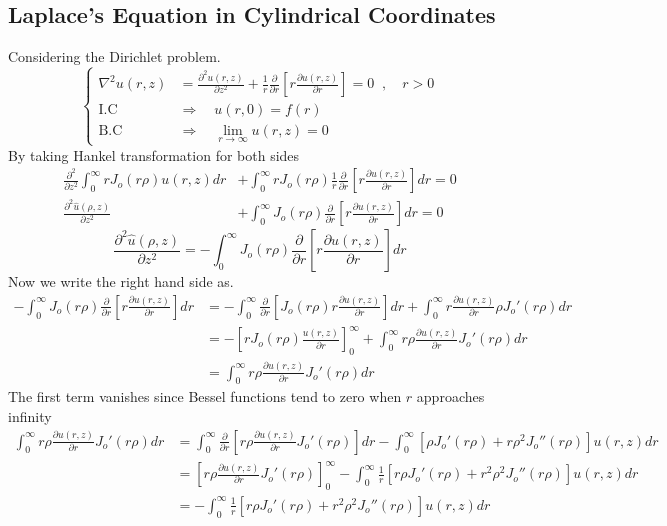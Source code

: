 \documentclass[]{article}
\begin{document}
\subsection{Laplace's Equation in Cylindrical Coordinates}
Considering the Dirichlet problem.
\[
    \begin{cases}
        \displaystyle \nabla^2 u(r,z) &= \frac{\partial^2 u(r,z)}{\partial z^2} + \frac{1}{r}\frac{\partial}{\partial r}\left[r\frac{\partial u(r,z)}{\partial r}\right] = 0 \;\; , \quad r >0
        \\
        \text{I.C} \quad &\Longrightarrow \quad u(r,0) = f(r)
        \\
        \text{B.C} \quad &\Longrightarrow \quad \lim_{r\rightarrow\infty} u(r,z) =0
    \end{cases}
\]
By taking Hankel transformation for both sides
\begin{align*}
\frac{\partial^2 }{\partial z^2}\int_{0}^{\infty} rJ_o(r\rho)u(r,z) dr &+ \int_{0}^{\infty}rJ_o(r\rho)\frac{1}{r}\frac{\partial}{\partial r}\left[r\frac{\partial u(r,z)}{\partial r}\right]dr = 0
\\
\frac{\partial^2 \hat{u}(\rho,z)}{\partial z^2} &+ \int_{0}^{\infty}J_o(r\rho)\frac{\partial}{\partial r}\left[r\frac{\partial u(r,z)}{\partial r}\right]dr = 0
\end{align*}
\[
    \frac{\partial^2 \hat{u}(\rho,z)}{\partial z^2}  = -\int_{0}^{\infty}J_o(r\rho)\frac{\partial}{\partial r}\left[r\frac{\partial u(r,z)}{\partial r}\right]dr    
\]
Now we write the right hand side as.
\begin{align*}
-\int_{0}^{\infty}J_o(r\rho)\frac{\partial}{\partial r}\left[r\frac{\partial u(r,z)}{\partial r}\right]dr &= -\int_{0}^{\infty}\frac{\partial}{\partial r}\left[J_o(r\rho)r\frac{\partial u(r,z)}{\partial r}\right]dr + \int_{0}^{\infty} r\frac{\partial u(r,z)}{\partial r} \rho J_o'(r\rho)dr
\\
&= -\left[rJ_o(r\rho)\frac{u(r,z)}{\partial r}\right]_{0}^{\infty} + \int_{0}^{\infty} r\rho\frac{\partial u(r,z)}{\partial r} J_o'(r\rho)dr
\\
&= \int_{0}^{\infty} r\rho\frac{\partial u(r,z)}{\partial r} J_o'(r\rho)dr
\end{align*}
The first term vanishes since Bessel functions tend to zero when $r$ approaches infinity
\begin{align*}
\int_{0}^{\infty} r\rho\frac{\partial u(r,z)}{\partial r} J_o'(r\rho)dr
&= \int_{0}^{\infty} \frac{\partial}{\partial r}\left[ r\rho\frac{\partial u(r,z)}{\partial r} J_o'(r\rho)\right]dr 
- \int_{0}^{\infty} \left[\rho J_o'(r\rho)+ r\rho^2 J_o''(r\rho)\right] u(r,z)dr
\\
&= \left[ r\rho\frac{\partial u(r,z)}{\partial r} J_o'(r\rho)\right]_{0}^{\infty} - \int_{0}^{\infty} \frac{1}{r}\left[r\rho J_o'(r\rho)+ r^2\rho^2 J_o''(r\rho)\right] u(r,z)dr
\\
&= - \int_{0}^{\infty} \frac{1}{r}\left[r\rho J_o'(r\rho)+ r^2\rho^2 J_o''(r\rho)\right] u(r,z)dr
\end{align*}
\end{document}
